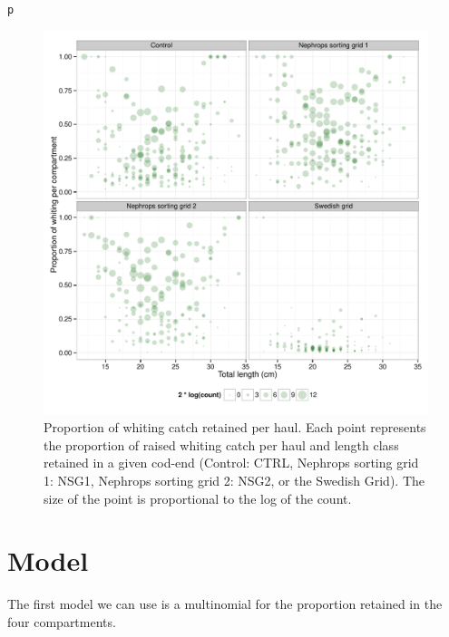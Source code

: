 \documentclass[12pt]{article}\usepackage[]{graphicx}\usepackage[]{color}
\makeatletter
\def\maxwidth{ %
  \ifdim\Gin@nat@width>\linewidth
    \linewidth
  \else
    \Gin@nat@width
  \fi
}
\newcommand{\hlstd}[1]{\textcolor[rgb]{0.345,0.345,0.345}{#1}}%
\newenvironment{kframe}{%
 \def\at@end@of@kframe{}%
 \ifinner\ifhmode%
  \def\at@end@of@kframe{\end{minipage}}%
  \begin{minipage}{\columnwidth}%
 \fi\fi%
 \def\FrameCommand##1{\hskip\@totalleftmargin \hskip-\fboxsep
 \colorbox{shadecolor}{##1}\hskip-\fboxsep
     \hskip-\linewidth \hskip-\@totalleftmargin \hskip\columnwidth}%
 \MakeFramed {\advance\hsize-\width
   \@totalleftmargin\z@ \linewidth\hsize
   \@setminipage}}%
 {\par\unskip\endMakeFramed%
 \at@end@of@kframe}
\newenvironment{knitrout}{}{} %
\makeatother
\begin{document}
\begin{knitrout}
\begin{kframe}
\begin{alltt}
\hlstd{p}
\end{alltt}
\end{kframe}\begin{figure}
\includegraphics[width=\maxwidth]{figure/unnamed-chunk-5-1} \caption[Proportion of whiting catch retained per haul]{Proportion of whiting catch retained per haul. Each point represents the proportion of raised whiting catch per haul and length class retained in a given cod-end (Control: CTRL, Nephrops sorting grid 1: NSG1, Nephrops sorting grid 2: NSG2, or the Swedish Grid). The size of the point is proportional to the log of the count.}\label{fig:unnamed-chunk-5}
\end{figure}


\end{knitrout}

\section{Model}
The first model we can use is a multinomial for the proportion retained in the four compartments. 
\end{document}
